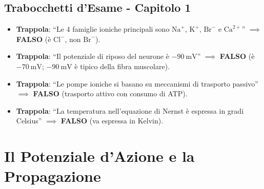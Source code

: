 \documentclass[10pt, letterpaper]{report}
\begin{document}
\section*{Trabocchetti d'Esame - Capitolo 1}
\begin{itemize}
    \item \textbf{Trappola}: ``Le 4 famiglie ioniche principali sono \(\text{Na}^+\), \(\text{K}^+\), \(\text{Br}^-\) e \(\text{Ca}^{2+}\)'' \(\implies\) \textbf{FALSO} (è \(\text{Cl}^-\), non \(\text{Br}^-\)).
    \item \textbf{Trappola}: ``Il potenziale di riposo del neurone è \(-90\ \text{mV}\)'' \(\implies\) \textbf{FALSO} (è \(-70\ \text{mV}\); \(-90\ \text{mV}\) è tipico della fibra muscolare).
    \item \textbf{Trappola}: ``Le pompe ioniche si basano su meccanismi di trasporto passivo'' \(\implies\) \textbf{FALSO} (trasporto attivo con consumo di ATP).
    \item \textbf{Trappola}: ``La temperatura nell'equazione di Nernst è espressa in gradi Celsius'' \(\implies\) \textbf{FALSO} (va espressa in Kelvin).
\end{itemize}

\chapter{Il Potenziale d'Azione e la Propagazione}
\end{document}
